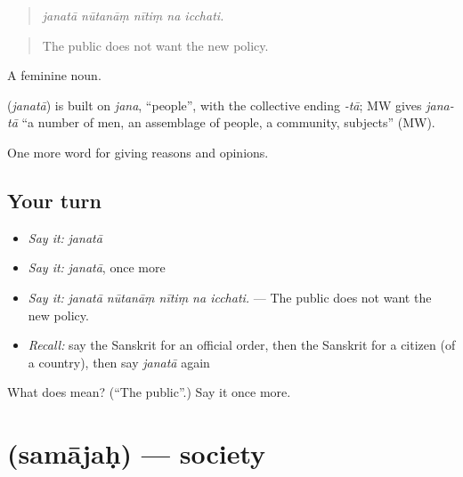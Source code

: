 \begin{quote}
    
\end{quote}

\begin{quote}
\emph{janatā nūtanāṃ nītiṃ na icchati.}
\end{quote}

\begin{quote}
The public does not want the new policy.
\end{quote}

A feminine noun.

\begin{cousinweb}
\textbf{} (\emph{janatā}) is built on \emph{jana}, \textquotedblleft{}people\textquotedblright{}, with the collective ending \emph{-tā}; MW gives \emph{jana-tā} \textquotedblleft{}a number of men, an assemblage of people, a community, subjects\textquotedblright{} (MW).
\end{cousinweb}

\begin{grammarlens}[title={What you've built}]
One more word for giving reasons and opinions.
\end{grammarlens}

\subsection*{Your turn}
\begin{itemize}
\raggedright
  \item \emph{Say it:} \emph{janatā}
  \item \emph{Say it:} \emph{janatā}, once more
  \item \emph{Say it:} \emph{janatā nūtanāṃ nītiṃ na icchati.} — The public does not want the new policy.
  \item \emph{Recall:} say the Sanskrit for an official order, then the Sanskrit for a citizen (of a country), then say \emph{janatā} again
\end{itemize}

\begin{tcolorbox}[breakable,colback=teal!4,colframe=teal!35!black,title={Before you move on}]
What does  mean? (\textquotedblleft{}The public\textquotedblright{}.) Say it once more.
\end{tcolorbox}
\section[\texorpdfstring{\sk{समाजः} (samājaḥ)}{समाजः (samājaḥ)}]{ (samājaḥ) — society}

